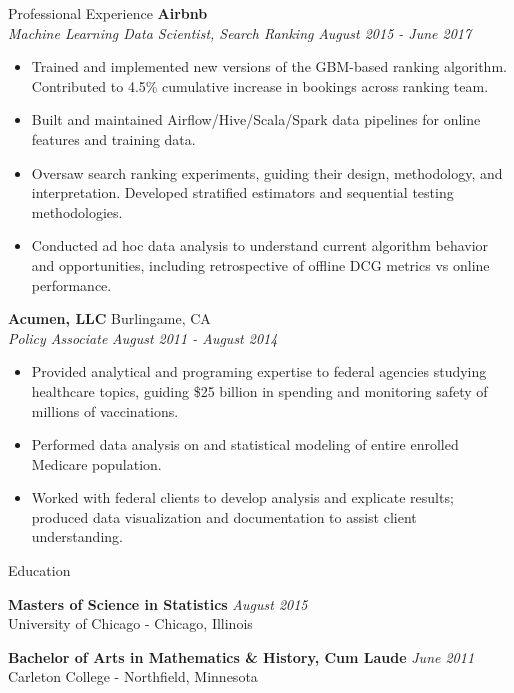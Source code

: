 \documentclass{resume} %
\begin{document}
\begin{rSection}{Professional Experience}
{\bf Airbnb} \\
{\em Machine Learning Data Scientist, Search Ranking} \hfill {\em August 2015 - June 2017} \vspace{0.1em} 
\vspace{-0.2em}
\begin{itemize} \itemsep -0.2em
    \item Trained and implemented new versions of the GBM-based ranking algorithm. Contributed to 4.5\% cumulative increase in bookings across ranking team.
    \item Built and maintained Airflow/Hive/Scala/Spark data pipelines for online features and training data.
    \item Oversaw search ranking experiments, guiding their design, methodology, and interpretation. Developed stratified estimators and sequential testing methodologies.
    \item Conducted ad hoc data analysis to understand current algorithm behavior and opportunities, including retrospective of offline DCG metrics vs online performance.
\end{itemize}


{\bf Acumen, LLC} \hfill Burlingame, CA \\
{\em Policy Associate} \hfill {\em August 2011 - August 2014} \vspace{0.1em} 
\begin{itemize} \itemsep -0.2em
    \item Provided analytical and programing expertise to federal agencies studying healthcare  topics, guiding \$25 billion in spending and monitoring safety of millions of vaccinations.
    \item Performed data analysis on and statistical modeling of entire enrolled Medicare population.
    \item Worked with federal clients to develop analysis and explicate results; produced data visualization and documentation to assist client understanding. 
\end{itemize}
\end{rSection}

\vspace{0.4em}

\begin{rSection}{Education}

    {\bf Masters of Science in Statistics} \hfill {\em August 2015} \\
    University of Chicago - Chicago, Illinois \\
    \vspace{-1.2em}

    {\bf Bachelor of Arts in Mathematics \& History, Cum Laude} \hfill {\em June 2011} \\ 
    Carleton College - Northfield, Minnesota  \\
\end{rSection}
\end{document}
